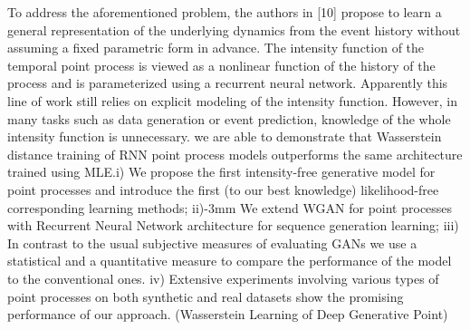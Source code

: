 To address the aforementioned problem, the authors in [10] propose to learn a general representation
of the underlying dynamics from the event history without assuming a fixed parametric form in
advance. The intensity function of the temporal point process is viewed as a nonlinear function of
the history of the process and is parameterized using a recurrent neural network. Apparently this
line of work still relies on explicit modeling of the intensity function. However, in many tasks such
as data generation or event prediction, knowledge of the whole intensity function is unnecessary. we are able to demonstrate that Wasserstein distance training of RNN point
process models outperforms the same architecture trained using MLE.i) We propose the first intensity-free generative model
for point processes and introduce the first (to our best knowledge) likelihood-free corresponding
learning methods; ii)-3mm We extend WGAN for point processes with Recurrent Neural Network
architecture for sequence generation learning; iii) In contrast to the usual subjective measures of
evaluating GANs we use a statistical and a quantitative measure to compare the performance of the
model to the conventional ones. iv) Extensive experiments involving various types of point processes
on both synthetic and real datasets show the promising performance of our approach.
(Wasserstein Learning of Deep Generative Point)

